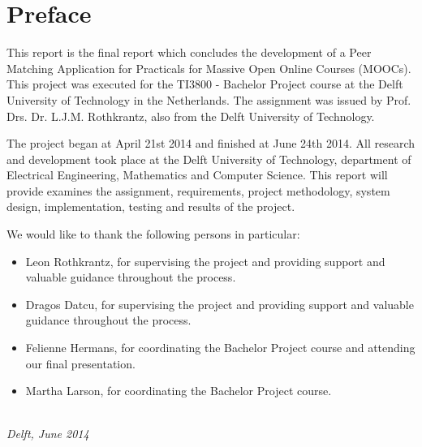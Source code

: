 \chapter*{Preface}

This report is the final report which concludes the development of a Peer Matching Application for Practicals for Massive Open Online Courses (MOOCs).
This project was executed for the TI3800 - Bachelor Project course at the Delft University of Technology in the Netherlands.
The assignment was issued by Prof. Drs. Dr. L.J.M. Rothkrantz, also from the Delft University of Technology.

The project began at April 21st 2014 and finished at June 24th 2014. All research and development took place at the Delft University of Technology, department of Electrical Engineering, Mathematics and Computer Science. This report will provide examines the assignment, requirements, project methodology, system design, implementation, testing and results of the project.

We would like to thank the following persons in particular:
\begin{itemize}
\item Leon Rothkrantz, for supervising the project and providing support and valuable guidance throughout the process.
\item Dragos Datcu, for supervising the project and providing support and valuable guidance throughout the process.
\item Felienne Hermans, for coordinating the Bachelor Project course and attending our final presentation.
\item Martha Larson, for coordinating the Bachelor Project course.
\end{itemize}

\begin{flushright}
{\makeatletter\itshape
    \@author \\
    Delft, June 2014
\makeatother}
\end{flushright}

